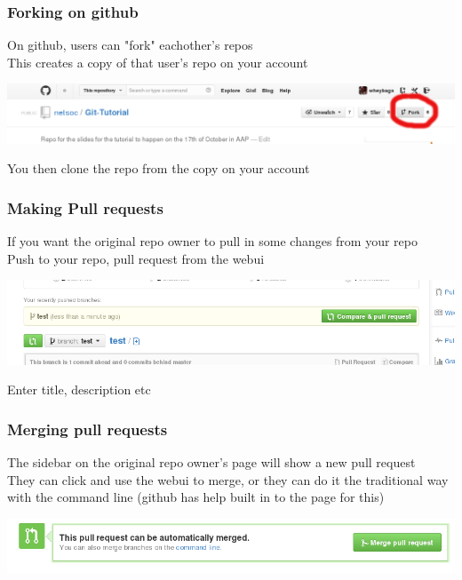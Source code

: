 \documentclass[xcolor=dvipsnames]{beamer}
\begin{document}
\begin{frame}
    \frametitle{Forking on github}

    On github, users can "fork" eachother's repos\\
    This creates a copy of that user's repo on your account\\

    \begin{center}
        \includegraphics[scale=0.3]{gh-fork.png}
    \end{center}

    You then clone the repo from the copy on your account
\end{frame}

\begin{frame}
    \frametitle{Making Pull requests}

    If you want the original repo owner to pull in some changes from your repo\\
    Push to your repo, pull request from the webui

    \begin{center}
        \includegraphics[scale=0.4]{gh-pullrequest.png}
    \end{center}

    Enter title, description etc
\end{frame}

\begin{frame}
    \frametitle{Merging pull requests}

    The sidebar on the original repo owner's page will show a new pull request\\
    They can click and use the webui to merge, or they can do it the traditional way with the command line (github has help built in to the page for this)

    \begin{center}
        \includegraphics[scale=0.4]{gh-mergepullrequest.png}
    \end{center}
\end{frame}
\end{document}
